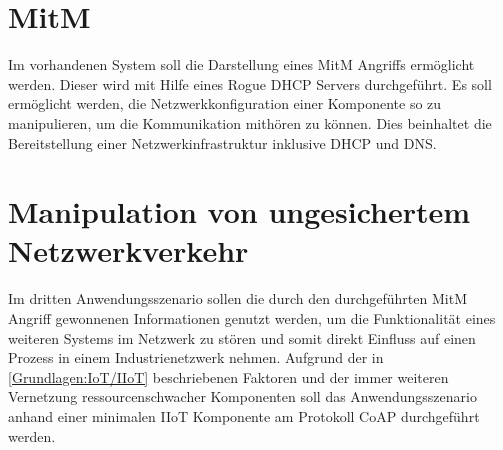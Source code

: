 \section{\ac{MitM}}
\label{Anwendungsszenarien:MitM}
Im vorhandenen System soll die Darstellung eines \ac{MitM} Angriffs ermöglicht werden. Dieser wird mit Hilfe eines Rogue \ac{DHCP} Servers durchgeführt. Es soll ermöglicht werden, die Netzwerkkonfiguration einer Komponente so zu manipulieren, um die Kommunikation mithören zu können. Dies beinhaltet die Bereitstellung einer Netzwerkinfrastruktur inklusive \ac{DHCP} und \ac{DNS}.

\section{Manipulation von ungesichertem Netzwerkverkehr}
\label{Anwendungsszenarien:Manipulation von ungesichertem Netzwerkverkehr}
Im dritten Anwendungsszenario sollen die durch den durchgeführten \ac{MitM} Angriff gewonnenen Informationen genutzt werden, um die Funktionalität eines weiteren Systems im Netzwerk zu stören und somit direkt Einfluss auf einen Prozess in einem Industrienetzwerk nehmen. Aufgrund der in \autoref{Grundlagen:IoT/IIoT} beschriebenen Faktoren und der immer weiteren Vernetzung ressourcenschwacher Komponenten soll das Anwendungsszenario anhand einer minimalen \ac{IIoT} Komponente am Protokoll \ac{CoAP} durchgeführt werden.